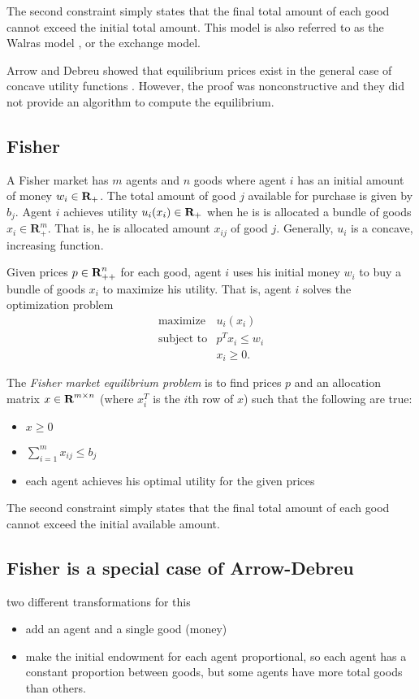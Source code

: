 \documentclass{article}
\begin{document}
The second constraint simply states that the final total amount of each good cannot exceed the initial total amount.
This model is also referred to as the Walras model \cite{walras1896elements}, or the exchange model.

Arrow and Debreu showed that equilibrium prices exist in the general case of concave utility functions \cite{arrow1954existence}. However, the proof was nonconstructive and they did not provide an algorithm to compute the equilibrium.


\subsection{Fisher}

A Fisher market has $m$ agents and $n$ goods where
agent $i$ has an initial amount of money $w_i \in {\mbox{\bf R}}_+$.
The total amount of good $j$ available for purchase is given by $b_j$.
Agent $i$ achieves utility $u_i(x_i) \in {\mbox{\bf R}}_+$ when he is is allocated a bundle of goods $x_i \in \mathbf{R}^m_{+}$. That is, he is allocated amount $x_{ij}$ of good $j$.
Generally, $u_i$ is a concave, increasing function.

Given prices $p \in {\mbox{\bf R}}^n_{++}$ for each good, agent $i$ uses his initial money $w_i$ to buy a bundle of goods $x_i$ to maximize his utility. That is, agent $i$ solves the optimization problem
\[
\begin{array}{ll}
\mbox{maximize} & u_i(x_i) \\
\mbox{subject to} & p^T x_i \leq w_i \\
& x_i \geq 0.
\end{array}
\]

The \emph{Fisher market equilibrium problem} is to find prices $p$ and an allocation matrix $x \in {\mbox{\bf R}}^{m \times n}$ (where $x_i^T$ is the $i$th row of $x$) such that the following are true:
\begin{itemize}
\item $x \geq 0$
\item $\sum_{i=1}^m x_{ij} \leq b_j$
\item each agent achieves his optimal utility for the given prices
\end{itemize}

The second constraint simply states that the final total amount of each good cannot exceed the initial available amount.



\subsection{Fisher is a special case of Arrow-Debreu}
two different transformations for this
\begin{itemize}
\item add an agent and a single good (money)
\item make the initial endowment for each agent proportional,
so each agent has a constant proportion between goods, but some agents have more total goods than others. 
\end{itemize}
\end{document}
